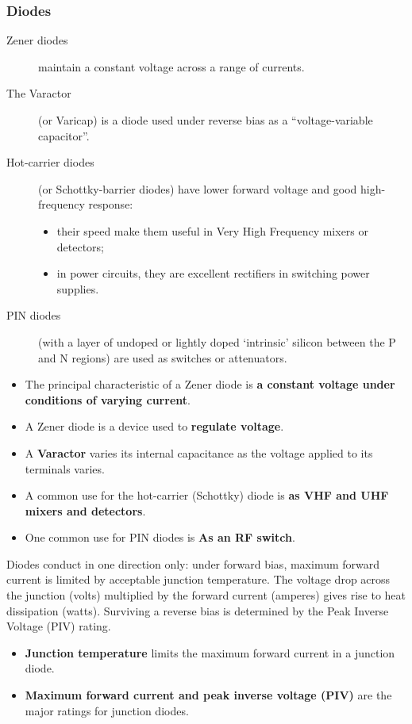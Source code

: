 \documentclass[letterpaper]{article}
\begin{document}
        \subsubsection{Diodes}
        \begin{description}
            \item[Zener diodes] maintain a constant voltage across a range of currents.
            \item[The Varactor] (or Varicap) is a diode used under reverse bias as a ``voltage-variable capacitor''.
            \item[Hot-carrier diodes] (or Schottky-barrier diodes) have lower forward voltage and good high-frequency response:
                \begin{itemize}
                    \item their speed make them useful in Very High Frequency mixers or detectors;
                    \item in power circuits, they are excellent rectifiers in switching power supplies.
                \end{itemize}
            \item[PIN diodes] (with a layer of undoped or lightly doped `intrinsic' silicon between the P and N regions) are used as switches or attenuators.
        \end{description}
        \begin{itemize}
            \item The principal characteristic of a Zener diode is \textbf{a constant voltage under conditions of varying current}.
            \item A Zener diode is a device used to \textbf{regulate voltage}.
            \item A \textbf{Varactor} varies its internal capacitance as the voltage applied to its terminals varies.
            \item A common use for the hot-carrier (Schottky) diode is \textbf{as VHF and UHF mixers and detectors}.
            \item One common use for PIN diodes is \textbf{As an RF switch}.
        \end{itemize}

        Diodes conduct in one direction only:
        under forward bias, maximum forward current is limited by acceptable junction temperature.
        The voltage drop across the junction (volts) multiplied by the forward current (amperes) gives rise to heat dissipation (watts).
        Surviving a reverse bias is determined by the Peak Inverse Voltage (PIV) rating.
        \begin{itemize}
            \item \textbf{Junction temperature} limits the maximum forward current in a junction diode.
            \item \textbf{Maximum forward current and peak inverse voltage (PIV)} are the major ratings for junction diodes.
        \end{itemize}
\end{document}
